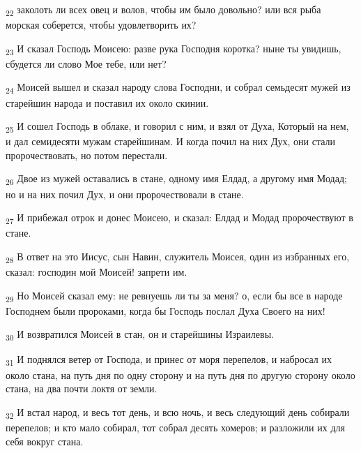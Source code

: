 \begin{tcolorbox}
\textsubscript{22} заколоть ли всех овец и волов, чтобы им было довольно? или вся рыба морская соберется, чтобы удовлетворить их?
\end{tcolorbox}
\begin{tcolorbox}
\textsubscript{23} И сказал Господь Моисею: разве рука Господня коротка? ныне ты увидишь, сбудется ли слово Мое тебе, или нет?
\end{tcolorbox}
\begin{tcolorbox}
\textsubscript{24} Моисей вышел и сказал народу слова Господни, и собрал семьдесят мужей из старейшин народа и поставил их около скинии.
\end{tcolorbox}
\begin{tcolorbox}
\textsubscript{25} И сошел Господь в облаке, и говорил с ним, и взял от Духа, Который на нем, и дал семидесяти мужам старейшинам. И когда почил на них Дух, они стали пророчествовать, но потом перестали.
\end{tcolorbox}
\begin{tcolorbox}
\textsubscript{26} Двое из мужей оставались в стане, одному имя Елдад, а другому имя Модад; но и на них почил Дух, и они пророчествовали в стане.
\end{tcolorbox}
\begin{tcolorbox}
\textsubscript{27} И прибежал отрок и донес Моисею, и сказал: Елдад и Модад пророчествуют в стане.
\end{tcolorbox}
\begin{tcolorbox}
\textsubscript{28} В ответ на это Иисус, сын Навин, служитель Моисея, один из избранных его, сказал: господин мой Моисей! запрети им.
\end{tcolorbox}
\begin{tcolorbox}
\textsubscript{29} Но Моисей сказал ему: не ревнуешь ли ты за меня? о, если бы все в народе Господнем были пророками, когда бы Господь послал Духа Своего на них!
\end{tcolorbox}
\begin{tcolorbox}
\textsubscript{30} И возвратился Моисей в стан, он и старейшины Израилевы.
\end{tcolorbox}
\begin{tcolorbox}
\textsubscript{31} И поднялся ветер от Господа, и принес от моря перепелов, и набросал их около стана, на путь дня по одну сторону и на путь дня по другую сторону около стана, на два почти локтя от земли.
\end{tcolorbox}
\begin{tcolorbox}
\textsubscript{32} И встал народ, и весь тот день, и всю ночь, и весь следующий день собирали перепелов; и кто мало собирал, тот собрал десять хомеров; и разложили их для себя вокруг стана.
\end{tcolorbox}
